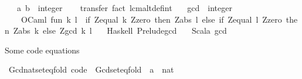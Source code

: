 \begin{isabellebody}
\ \ \ a\ b\ {\isacharcolon}{\kern0pt}{\isacharcolon}{\kern0pt}\ integer\isanewline
%
\isadelimproof
\ \ %
\endisadelimproof
%
\isatagproof
{}\isamarkupfalse%
\ transfer\ {\isacharparenleft}{\kern0pt}fact\ lcm{\isacharunderscore}{\kern0pt}altdef{\isacharunderscore}{\kern0pt}int{\isacharparenright}{\kern0pt}%
\endisatagproof
{\isafoldproof}%
%
\isadelimproof
\isanewline
%
\endisadelimproof
\isanewline
{}\isamarkupfalse%
\isanewline
\isanewline
{}\isamarkupfalse%
\isanewline
\ \ \ {\isachardoublequoteopen}gcd\ {\isacharcolon}{\kern0pt}{\isacharcolon}{\kern0pt}\ integer\ {\isasymRightarrow}\ {\isacharunderscore}{\kern0pt}{\isachardoublequoteclose}\ {\isasymrightharpoonup}\isanewline
\ \ \ \ {\isacharparenleft}{\kern0pt}OCaml{\isacharparenright}{\kern0pt}\ {\isachardoublequoteopen}{\isacharbang}{\kern0pt}{\isacharparenleft}{\kern0pt}fun\ k\ l\ {\isacharminus}{\kern0pt}{\isachargreater}{\kern0pt}\ if\ Z{\isachardot}{\kern0pt}equal\ k\ Z{\isachardot}{\kern0pt}zero\ then{\isacharslash}{\kern0pt}\ Z{\isachardot}{\kern0pt}abs\ l\ else\ if\ Z{\isachardot}{\kern0pt}equal{\isacharslash}{\kern0pt}\ l\ Z{\isachardot}{\kern0pt}zero\ then\ Z{\isachardot}{\kern0pt}abs\ k\ else\ Z{\isachardot}{\kern0pt}gcd\ k\ l{\isacharparenright}{\kern0pt}{\isachardoublequoteclose}\isanewline
\ \ \ {\isacharparenleft}{\kern0pt}Haskell{\isacharparenright}{\kern0pt}\ {\isachardoublequoteopen}Prelude{\isachardot}{\kern0pt}gcd{\isachardoublequoteclose}\isanewline
\ \ \ {\isacharparenleft}{\kern0pt}Scala{\isacharparenright}{\kern0pt}\ {\isachardoublequoteopen}{\isacharunderscore}{\kern0pt}{\isachardot}{\kern0pt}gcd{\isacharprime}{\kern0pt}{\isacharparenleft}{\kern0pt}{\isacharparenleft}{\kern0pt}{\isacharunderscore}{\kern0pt}{\isacharparenright}{\kern0pt}{\isacharprime}{\kern0pt}{\isacharparenright}{\kern0pt}{\isachardoublequoteclose}\isanewline
\ \ %
%
\begin{isamarkuptext}%
Some code equations%
\end{isamarkuptext}\isamarkuptrue%
\isamarkupfalse%
\ Gcd{\isacharunderscore}{\kern0pt}nat{\isacharunderscore}{\kern0pt}set{\isacharunderscore}{\kern0pt}eq{\isacharunderscore}{\kern0pt}fold\ {\isacharbrackleft}{\kern0pt}code{\isacharbrackright}{\kern0pt}\ {\isacharequal}{\kern0pt}\ Gcd{\isacharunderscore}{\kern0pt}set{\isacharunderscore}{\kern0pt}eq{\isacharunderscore}{\kern0pt}fold\ {\isacharbrackleft}{\kern0pt}\ {\isacharquery}{\kern0pt}{\isacharprime}{\kern0pt}a\ {\isacharequal}{\kern0pt}\ nat{\isacharbrackright}{\kern0pt}\isanewline

\end{isabellebody}
